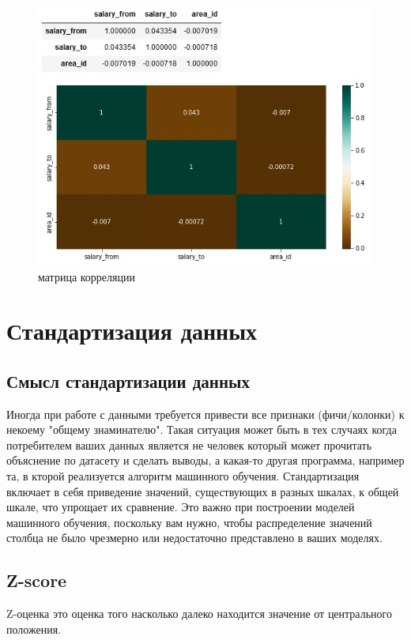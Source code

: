 \documentclass[12pt, a4paper]{article}
\begin{document}
{\begin{figure}[h]
    \begin{center}
        \includegraphics[scale=0.5,keepaspectratio]
        {Pictures/Picture_10.jpg}
        \caption{матрица корреляции}
        \label{Picture_10}
    \end{center}
\end{figure}

\section{Стандартизация данных}

\subsection{Смысл стандартизации данных}

Иногда при работе с данными требуется привести все 
признаки (фичи/колонки) к некоему "общему знаминателю". 
Такая ситуация может быть в тех случаях когда 
потребителем ваших данных является не человек 
который может прочитать объяснение по датасету и 
сделать выводы, а какая-то другая программа, например 
та, в кторой реализуется алгоритм машинного обучения.
Стандартизация включает в себя приведение значений, 
существующих в разных шкалах, к общей шкале, что 
упрощает их сравнение. Это важно при построении 
моделей машинного обучения, поскольку вам нужно, чтобы 
распределение значений столбца не было чрезмерно или 
недостаточно представлено в ваших моделях.

\subsection{Z-score}
Z-оценка это оценка того насколько далеко находится значение от центрального положения.

}
\end{document}
